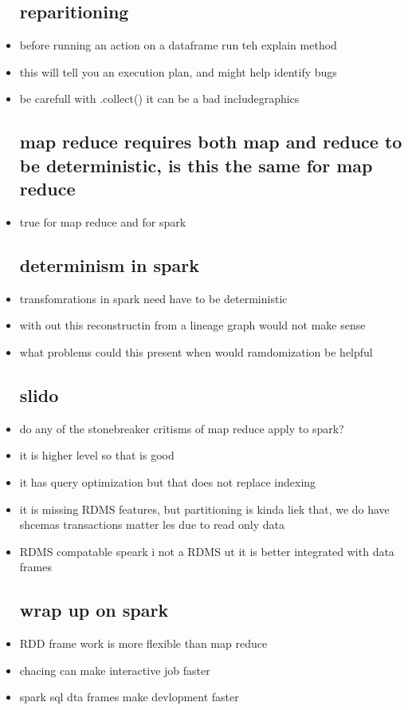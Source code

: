 \documentclass{article}
\begin{document}
\begin{itemize}
\subsection*{reparitioning}
\item before running an action on a dataframe run teh explain method 
\item this will tell you an execution plan, and might help identify bugs
\item be carefull with .collect() it can be a bad includegraphics
\subsection*{map reduce requires both map and reduce to be deterministic, is this the same for map reduce}
\item true for map reduce and for spark
\subsection*{determinism in spark}
\item transfomrations in spark need have to be deterministic
\item with out this reconstructin from a lineage graph would not make sense 
\item what problems could this present when would ramdomization be helpful
\subsection*{slido}
\item do any of the stonebreaker critisms of map reduce apply to spark? 
\item it is higher level so that is good 
\item it has query optimization but that does not replace indexing 
\item it is missing RDMS features, but partitioning is kinda liek that, we do have shcemas transactions matter les due to read only data 
\item RDMS compatable speark i not a RDMS ut it is better integrated with data frames
\subsection*{wrap up on spark}
\item RDD frame work is more flexible than map reduce
\item chacing can make interactive job faster 
\item spark sql dta frames make devlopment faster 

\end{itemize} 
\end{document}
